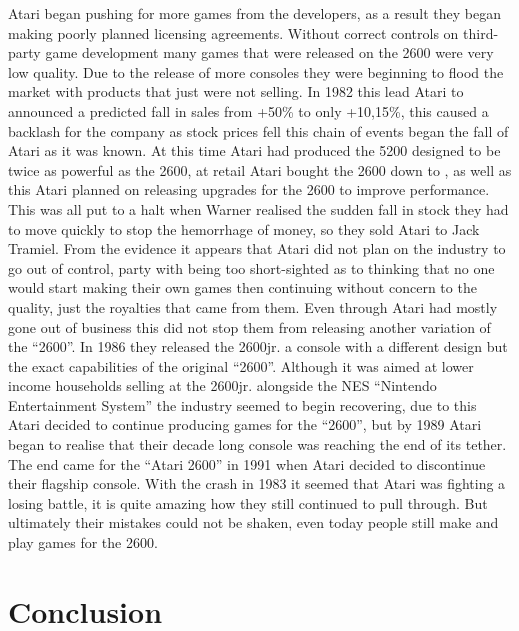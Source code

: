 \documentclass{scrartcl}
\begin{document}
Atari began pushing for more games from the developers, as a result they began making poorly planned licensing agreements. Without correct controls on third-party game development many games that were released on the 2600 were very low quality. Due to the release of more consoles they were beginning to flood the market with products that just were not selling. In 1982 this lead Atari to announced a predicted fall in sales from +50\% to only +10,15\%, this caused a backlash for the company as stock prices fell this chain of events began the fall of Atari as it was known\cite{ultimate,race}. At this time Atari had produced the 5200 designed to be twice as powerful as the 2600, at  retail Atari bought the 2600 down to , as well as this Atari planned on releasing upgrades for the 2600 to improve performance. This was all put to a halt when Warner realised the sudden fall in stock they had to move quickly to stop the hemorrhage of money, so they sold Atari to Jack Tramiel\cite{ultimate,age}. From the evidence it appears that Atari did not plan on the industry to go out of control, party with being too short-sighted as to thinking that no one would start making their own games then continuing without concern to the quality, just the royalties that came from them. 
\newline
\newline
Even through Atari had mostly gone out of business this did not stop them from releasing another variation of the “2600”. In 1986 they released the 2600jr. a console with a different design but the exact capabilities of the original “2600”. Although it was aimed at lower income households selling at  the 2600jr. alongside the NES “Nintendo Entertainment System” the industry seemed to begin recovering, due to this Atari decided to continue producing games for the “2600”, but by 1989 Atari began to realise that their decade long console was reaching the end of its tether. The end came for the “Atari 2600” in 1991 when Atari decided to discontinue their flagship console\cite{atarii,age}. With the crash in 1983 it seemed that Atari was fighting a losing battle, it is quite amazing how they still continued to pull through. But ultimately their mistakes could not be shaken, even today people still make and play games for the 2600.


\section{Conclusion}
\end{document}
